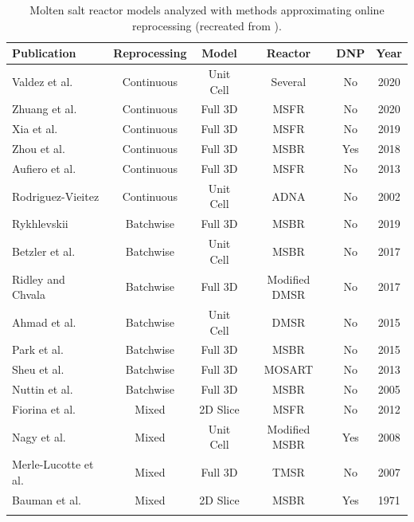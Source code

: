 \begin{table}[H]
\renewcommand{\arraystretch}{1.25}
\caption{Molten salt reactor models analyzed with methods approximating online reprocessing (recreated from \cite{seifert2023analysis}).}
\begin{center}
\begin{tabular}{  l  c  c  c  c  c}
    \hline
 Publication & Reprocessing & Model & Reactor & DNP & Year\\
 \hline
 Valdez et al. \cite{jr2020modeling} & Continuous & Unit Cell & Several & No & 2020\\
 Zhuang et al. \cite{zhuang_extended_2020} & Continuous & Full 3D & \gls{MSFR} & No & 2020\\
 Xia et al. \cite{xia_development_2019} & Continuous & Full 3D & \gls{MSFR} & No & 2019\\
 Zhou et al. \cite{zhou_fuel_2018} & Continuous & Full 3D & \gls{MSBR} & Yes & 2018\\
 Aufiero et al. \cite{aufiero_extended_2013} & Continuous & Full 3D & \gls{MSFR} & No & 2013\\
 Rodriguez-Vieitez \cite{rodriguez-vieitez_transmutation_2002} & Continuous & Unit Cell & \gls{ADNA} & No & 2002\\
 \hline
 Rykhlevskii \cite{rykhlevskii_modeling_2019} & Batchwise & Full 3D & \gls{MSBR} & No & 2019\\
 Betzler et al. \cite{betzler_molten_2017} & Batchwise & Unit Cell & \gls{MSBR} & No & 2017\\
 Ridley and Chvala \cite{ridley_method_2017} & Batchwise & Full 3D & Modified \gls{DMSR} & No & 2017\\
 Ahmad et al. \cite{ahmad_neutronics_2015} & Batchwise & Unit Cell & \gls{DMSR} & No & 2015\\
 Park et al. \cite{park_whole_2015} & Batchwise & Full 3D & MSBR & No & 2015\\
 Sheu et al. \cite{sheu_depletion_2013} & Batchwise & Full 3D & \gls{MOSART} & No & 2013\\
 Nuttin et al. \cite{nuttin_potential_2005} & Batchwise & Full 3D & \gls{MSBR} & No & 2005\\
 \hline
 Fiorina et al. \cite{fiorina_preliminary_2012} & Mixed & 2D Slice & \gls{MSFR} & No & 2012\\
 Nagy et al. \cite{nagy_parametric_2008} & Mixed & Unit Cell & Modified \gls{MSBR} & Yes & 2008\\
 Merle-Lucotte et al. \cite{merle-lucotte_thorium_2007} & Mixed & Full 3D & \gls{TMSR} & No & 2007\\
 Bauman et al. \cite{h_f_bauman_rod_1971} & Mixed & 2D Slice & \gls{MSBR} & Yes & 1971\\
 
 \hline
 \label{tab:codes_types}
\end{tabular}
\end{center}
\end{table}


